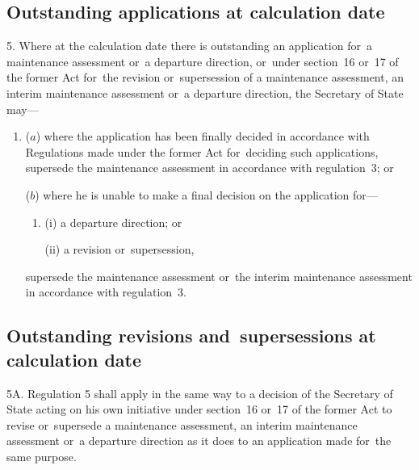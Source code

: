 \documentclass[12pt,a4paper]{article}
\begin{document}

\subsection[5. Outstanding applications at calculation date]{Outstanding applications at calculation date}

5.  Where at the calculation date there is outstanding an application for~a maintenance assessment or~a departure direction, or~under section~16 or~17 of the former Act for~the revision or~supersession of a maintenance assessment, an interim maintenance assessment or~a departure direction, the Secretary of State may—
\begin{enumerate}\item[]
($a$) where the application has been finally decided in accordance with Regulations made under the former Act for~deciding such applications, supersede the maintenance assessment in accordance with regulation~3; or

($b$) where he is unable to make a final decision on the application for—
\begin{enumerate}\item[]
(i) a departure direction; or

(ii) a revision or~supersession,
\end{enumerate}
supersede the maintenance assessment or~the interim maintenance assessment in accordance with regulation~3.
\end{enumerate}

\subsection[5A. Outstanding revisions and~supersessions at calculation date]{Outstanding revisions and~supersessions at calculation date}

5A.  Regulation 5 shall apply in the same way to a decision of the Secretary of State acting on his own initiative under section~16 or~17 of the former Act to revise or~supersede a maintenance assessment, an interim maintenance assessment or~a departure direction as it does to an application made for~the same purpose.

\end{document}
